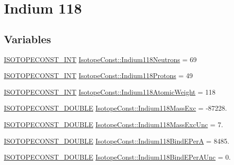\hypertarget{group___isotope_const-_indium-_in118}{}\section{Indium 118}
\label{group___isotope_const-_indium-_in118}
\subsection*{Variables}
\begin{DoxyCompactItemize}
\item 
\mbox{\hyperlink{group___isotope_const-_macros_ga5f18360b3e99483a35c32d789e62621c}{I\+S\+O\+T\+O\+P\+E\+C\+O\+N\+S\+T\+\_\+\+I\+NT}} \mbox{\hyperlink{group___isotope_const-_indium-_in118_ga94f26c75f6f9183bd79395944d2e57f3}{Isotope\+Const\+::\+Indium118\+Neutrons}} = 69
\item 
\mbox{\hyperlink{group___isotope_const-_macros_ga5f18360b3e99483a35c32d789e62621c}{I\+S\+O\+T\+O\+P\+E\+C\+O\+N\+S\+T\+\_\+\+I\+NT}} \mbox{\hyperlink{group___isotope_const-_indium-_in118_ga3f7503d6925678ec7643b5f8ca19b9a5}{Isotope\+Const\+::\+Indium118\+Protons}} = 49
\item 
\mbox{\hyperlink{group___isotope_const-_macros_ga5f18360b3e99483a35c32d789e62621c}{I\+S\+O\+T\+O\+P\+E\+C\+O\+N\+S\+T\+\_\+\+I\+NT}} \mbox{\hyperlink{group___isotope_const-_indium-_in118_ga9faf4f21e6374ef602030f34885abea5}{Isotope\+Const\+::\+Indium118\+Atomic\+Weight}} = 118
\item 
\mbox{\hyperlink{group___isotope_const-_macros_ga8f45a7272ce02c0b4c65c44636ed719a}{I\+S\+O\+T\+O\+P\+E\+C\+O\+N\+S\+T\+\_\+\+D\+O\+U\+B\+LE}} \mbox{\hyperlink{group___isotope_const-_indium-_in118_ga41b192e8590cb1eac837bfa9704d9063}{Isotope\+Const\+::\+Indium118\+Mass\+Exc}} = -\/87228.
\item 
\mbox{\hyperlink{group___isotope_const-_macros_ga8f45a7272ce02c0b4c65c44636ed719a}{I\+S\+O\+T\+O\+P\+E\+C\+O\+N\+S\+T\+\_\+\+D\+O\+U\+B\+LE}} \mbox{\hyperlink{group___isotope_const-_indium-_in118_ga18e5c06d72506353e2d0c83fcf79851d}{Isotope\+Const\+::\+Indium118\+Mass\+Exc\+Unc}} = 7.
\item 
\mbox{\hyperlink{group___isotope_const-_macros_ga8f45a7272ce02c0b4c65c44636ed719a}{I\+S\+O\+T\+O\+P\+E\+C\+O\+N\+S\+T\+\_\+\+D\+O\+U\+B\+LE}} \mbox{\hyperlink{group___isotope_const-_indium-_in118_gaed47a173084b01ebaa51cf31f64a5d7a}{Isotope\+Const\+::\+Indium118\+Bind\+E\+PerA}} = 8485.
\item 
\mbox{\hyperlink{group___isotope_const-_macros_ga8f45a7272ce02c0b4c65c44636ed719a}{I\+S\+O\+T\+O\+P\+E\+C\+O\+N\+S\+T\+\_\+\+D\+O\+U\+B\+LE}} \mbox{\hyperlink{group___isotope_const-_indium-_in118_gac67c536391d18747feaa5a9ffd9a62e7}{Isotope\+Const\+::\+Indium118\+Bind\+E\+Per\+A\+Unc}} = 0.

\end{DoxyCompactItemize}
